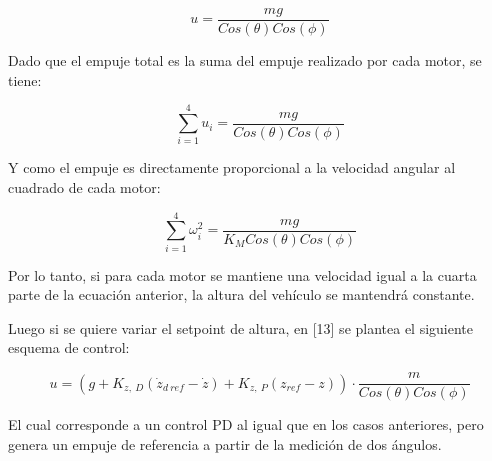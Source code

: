 \documentclass[\main/main.tex]{subfiles}
\begin{document}
\[
u=\frac{mg}{Cos(\theta)Cos(\phi)}
\]

Dado que el empuje total es la suma del empuje realizado por cada
motor, se tiene:

\[
\sum_{i=1}^{4}u_{i}=\frac{mg}{Cos(\theta)Cos(\phi)}
\]

Y como el empuje es directamente proporcional a la velocidad angular
al cuadrado de cada motor:

\[
\sum_{i=1}^{4}\omega_{i}^{2}=\frac{mg}{K_{M}Cos(\theta)Cos(\phi)}
\]

Por lo tanto, si para cada motor se mantiene una velocidad igual a
la cuarta parte de la ecuación anterior, la altura del vehículo se
mantendrá constante. 

Luego si se quiere variar el setpoint de altura, en [13] se plantea
el siguiente esquema de control:

\[
u=(g+K_{z,\ D}(\dot{z}_{d\ ref}-\dot{z})+K_{z,\ P}(z_{ref}-z))\cdot\frac{m}{Cos(\theta)Cos(\phi)}
\]

El cual corresponde a un control PD al igual que en los casos anteriores,
pero genera un empuje de referencia a partir de la medición de dos
ángulos.
\end{document}
